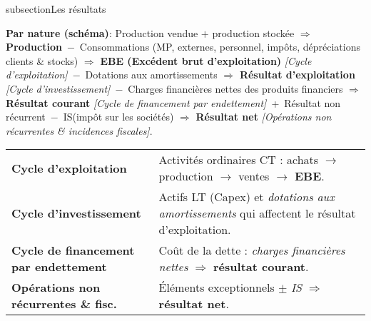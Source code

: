 \documentclass[10pt,landscape]{article}
\begin{document}
\begin{multicols}{3}
    subsection{Les résultats}

    \noindent\small
    \textbf{Par nature (schéma)}:\;
    Production vendue $+$ production stockée $\Rightarrow$ \textbf{Production}
    \,$-\,$ Consommations (MP, externes, personnel, impôts, dépréciations clients \& stocks)
    $\Rightarrow$ \textbf{EBE (Excédent brut d'exploitation)} \;\;\textit{\footnotesize[Cycle d'exploitation]}
    \,$-\,$ Dotations aux amortissements
    $\Rightarrow$ \textbf{Résultat d'exploitation} \;\;\textit{\footnotesize[Cycle d'investissement]}
    \,$-\,$ Charges financières nettes des produits financiers
    $\Rightarrow$ \textbf{Résultat courant} \;\;\textit{\footnotesize[Cycle de financement par endettement]}
    \,+\, Résultat non récurrent \,$-\,$ IS(impôt sur les sociétés)
    $\Rightarrow$ \textbf{Résultat net} \;\;\textit{\footnotesize[Opérations non récurrentes \& incidences fiscales]}.

    \medskip
    \noindent\begin{tabularx}{\linewidth}{@{}>{\raggedright\arraybackslash}p{4.2cm} X@{}}
        \textbf{Cycle d'exploitation}                 &
        Activités ordinaires CT : achats $\to$ production $\to$ ventes $\to$ \textbf{EBE}.                   \\
        \textbf{Cycle d'investissement}               &
        Actifs LT (Capex) et \textit{dotations aux amortissements} qui affectent le résultat d'exploitation. \\
        \textbf{Cycle de financement par endettement} &
        Coût de la dette : \textit{charges financières nettes} $\Rightarrow$ \textbf{résultat courant}.      \\
        \textbf{Opérations non récurrentes \& fisc.}  &
        Éléments exceptionnels $\pm$ \textit{IS} $\Rightarrow$ \textbf{résultat net}.                        \\
    \end{tabularx}


\end{multicols}
\end{document}
